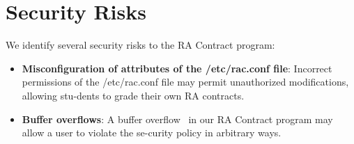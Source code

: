 \section{Security Risks}
\label{section:risks}

We identify several security risks to the RA Contract program:

\begin{itemize}
  \item{\textbf{Misconfiguration of attributes of the /etc/rac.conf file}:}
  Incorrect permissions of the /etc/rac.conf file may permit unauthorized
  modifications, allowing stu-dents to grade their own RA contracts.

  \item{\textbf{Buffer overflows}:}
  A buffer overflow~\cite{AlephOne:StackSmash} in our RA Contract program may
  allow a user to violate the se-curity policy in arbitrary ways.
\end{itemize}
